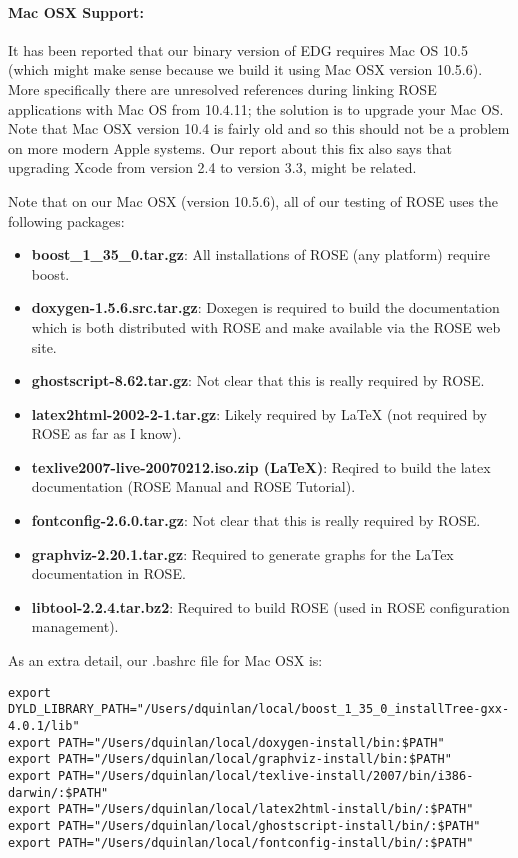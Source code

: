 \paragraph{Mac OSX Support:}
   It has been reported that our binary version of EDG requires Mac OS 10.5
(which might make sense because we build it using Mac OSX version 10.5.6).  More
specifically there are unresolved references during linking ROSE applications with
Mac OS from 10.4.11; the solution is to upgrade your Mac OS.  Note that Mac OSX 
version 10.4 is fairly old and so this should not be a problem on more modern Apple
systems.  Our report about this fix also says that upgrading Xcode from version 2.4 
to version 3.3, might be related.

Note that on our Mac OSX (version 10.5.6), all of our testing of ROSE uses the following packages:
\begin{itemize}
   \item {\bf boost\_1\_35\_0.tar.gz}:
     All installations of ROSE (any platform) require boost.

   \item {\bf doxygen-1.5.6.src.tar.gz}:
     Doxegen is required to build the documentation which is both distributed with ROSE
     and make available via the ROSE web site.

   \item {\bf ghostscript-8.62.tar.gz}:
     Not clear that this is really required by ROSE.

   \item {\bf latex2html-2002-2-1.tar.gz}:
     Likely required by LaTeX (not required by ROSE as far as I know).

   \item {\bf texlive2007-live-20070212.iso.zip (LaTeX)}:
     Reqired to build the latex documentation (ROSE Manual and ROSE Tutorial).

   \item {\bf fontconfig-2.6.0.tar.gz}:
     Not clear that this is really required by ROSE.

   \item {\bf graphviz-2.20.1.tar.gz}:
     Required to generate graphs for the LaTex documentation in ROSE.

   \item {\bf libtool-2.2.4.tar.bz2}:
     Required to build ROSE (used in ROSE configuration management).
\end{itemize}

As an extra detail, our .bashrc file for Mac OSX is:
\begin{verbatim}
export DYLD_LIBRARY_PATH="/Users/dquinlan/local/boost_1_35_0_installTree-gxx-4.0.1/lib"
export PATH="/Users/dquinlan/local/doxygen-install/bin:$PATH"
export PATH="/Users/dquinlan/local/graphviz-install/bin:$PATH"
export PATH="/Users/dquinlan/local/texlive-install/2007/bin/i386-darwin/:$PATH"
export PATH="/Users/dquinlan/local/latex2html-install/bin/:$PATH"
export PATH="/Users/dquinlan/local/ghostscript-install/bin/:$PATH"
export PATH="/Users/dquinlan/local/fontconfig-install/bin/:$PATH"
\end{verbatim}

